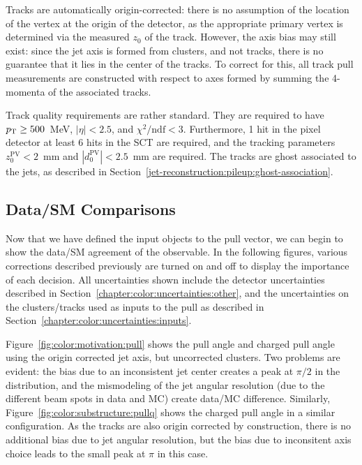 Tracks are automatically origin-corrected: there is no assumption of the location of the vertex at the origin of the detector, as the appropriate primary vertex is determined via the measured $z_0$ of the track. However, the axis bias may still exist: since the jet axis is formed from clusters, and not tracks, there is no guarantee that it lies in the center of the tracks. To correct for this, all track pull measurements are constructed with respect to axes formed by summing the 4-momenta of the associated tracks.

Track quality requirements are rather standard. They are required to have $p_{\text{T}} \geq 500$~MeV, $|\eta| < 2.5$, and $\chi^2/\mathrm{ndf} < 3$. Furthermore, 1 hit in the pixel detector at least 6 hits in the SCT are required, and the tracking parameters $z_0^\mathrm{PV} < 2$~mm and $|d_0^\mathrm{PV}| < 2.5$~mm are required. The tracks are ghost associated to the jets, as described in Section~\ref{jet-reconstruction:pileup:ghost-association}.

\subsection{Data/SM Comparisons}
\label{chapter:color:comparisons}

Now that we have defined the input objects to the pull vector, we can begin to show the data/SM agreement of the observable. In the following figures, various corrections described previously are turned on and off to display the importance of each decision. All uncertainties shown include the detector uncertainties described in Section~\ref{chapter:color:uncertainties:other}, and the uncertainties on the clusters/tracks used as inputs to the pull as described in Section~\ref{chapter:color:uncertainties:inputs}.

Figure~\ref{fig:color:motivation:pull} shows the pull angle and charged pull angle using the origin corrected jet axis, but uncorrected clusters. Two problems are evident: the bias due to an inconsistent jet center creates a peak at $\pi/2$ in the distribution, and the mismodeling of the jet angular resolution (due to the different beam spots in data and MC) create data/MC difference. Similarly, Figure~\ref{fig:color:substructure:pullq} shows the charged pull angle in a similar configuration. As the tracks are also origin corrected by construction, there is no additional bias due to jet angular resolution, but the bias due to inconsitent axis choice leads to the small peak at $\pi$ in this case.

